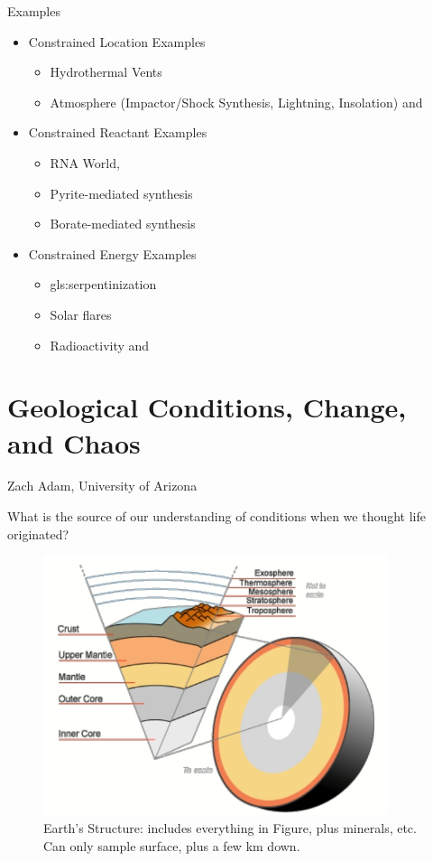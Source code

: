 \documentclass[]{article}
\begin{document}
Examples
\begin{itemize}
	\item Constrained Location Examples \begin{itemize}
		\item Hydrothermal Vents\cite{martin2006origin}
		\item Atmosphere (Impactor/Shock Synthesis, Lightning,
		Insolation)\cite{chyba1992endogenous} and \cite{miller1959organic}
	\end{itemize}
	\item Constrained Reactant Examples 
	\begin{itemize}
		\item RNA World\cite{powner2009synthesis},
		\item Pyrite-mediated synthesis\cite{wachtershauser1993cradle}
		\item Borate-mediated synthesis\cite{grew2011borate}
	\end{itemize}
	\item Constrained Energy Examples
	\begin{itemize}
		\item \gls{gls:serpentinization}\cite{schrenk2013serpentinization}
		\item Solar flares\cite{airapetian2016prebiotic}
		\item Radioactivity\cite{yi2018radiolytic} and \cite{adam2018estimating}
	\end{itemize}
\end{itemize}
\section{Geological Conditions, Change, and Chaos}

Zach Adam, University of Arizona\cite{spencer2017growth}

What is the source of our understanding of conditions when we thought life originated?
\begin{figure}[H]
	\caption{Earth's Structure: includes everything in Figure, plus minerals, etc. Can only sample surface, plus a few km down.}\label{fig:EarthStructure} 
	\includegraphics[width=0.9\textwidth]{EarthStructure}
\end{figure}
\end{document}
